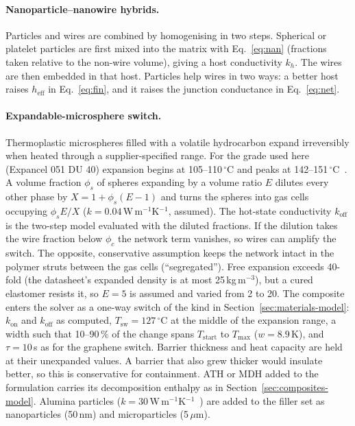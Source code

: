 \documentclass[11pt]{article}
\newcommand{\kon}{k_\mathrm{on}}
\newcommand{\koff}{k_\mathrm{off}}
\newcommand{\Tsw}{T_\mathrm{sw}}
\begin{document}
\paragraph{Nanoparticle--nanowire hybrids.} Particles and wires are combined by
homogenising in two steps. Spherical or platelet particles are first mixed into the
matrix with Eq.~\eqref{eq:nan} (fractions taken relative to the non-wire volume),
giving a host conductivity $k_h$. The wires are then embedded in that host. Particles help
wires in two ways: a better host raises $h_\mathrm{eff}$ in Eq.~\eqref{eq:fin}, and it
raises the junction conductance in Eq.~\eqref{eq:net}.

\paragraph{Expandable-microsphere switch.} Thermoplastic microspheres filled with a
volatile hydrocarbon expand irreversibly when heated through a supplier-specified
range. For the grade used here (Expancel 051 DU 40) expansion begins at 105--110\,$^\circ$C
and peaks at 142--151\,$^\circ$C~\cite{expancel051}. A volume fraction $\phi_s$ of spheres
expanding by a volume ratio $E$ dilutes every other phase by
$X = 1 + \phi_s(E-1)$ and turns the spheres into gas cells occupying $\phi_s E/X$
($k = 0.04$\,W\,m$^{-1}$K$^{-1}$, assumed). The hot-state conductivity $\koff$ is the
two-step model evaluated with the diluted fractions. If the dilution takes the wire
fraction below $\phi_c$ the network term vanishes, so wires can amplify the switch.
The opposite, conservative assumption keeps the network intact in the polymer struts
between the gas cells (``segregated''). Free expansion exceeds 40-fold (the datasheet's
expanded density is at most 25\,kg\,m$^{-3}$), but a cured elastomer resists it, so
$E = 5$ is assumed and varied from 2 to 20. The composite enters the solver as a
one-way switch of the kind in Section~\ref{sec:materials-model}: $\kon$ and $\koff$
as computed, $\Tsw = 127\,^\circ$C at the middle of the expansion range, a width such that
10--90\,\% of the change spans $T_\mathrm{start}$ to $T_\mathrm{max}$ ($w = 8.9$\,K), and
$\tau = 10$\,s as for the graphene switch. Barrier thickness and heat capacity are held at
their unexpanded values. A barrier that also grew thicker would insulate better, so this
is conservative for containment. ATH or MDH added to the formulation carries its
decomposition enthalpy as in Section~\ref{sec:composites-model}. Alumina particles
($k = 30$\,W\,m$^{-1}$K$^{-1}$~\cite{kyocera_al2o3}) are added to the filler set as
nanoparticles (50\,nm) and microparticles (5\,$\mu$m).
\end{document}

